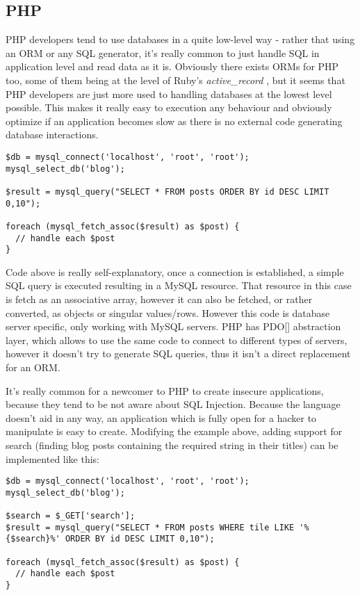 \subsection{PHP}

PHP developers tend to use databases in a quite low-level way - rather that using an ORM or any SQL generator, it's really common to just handle SQL in application level and read data as it is. Obviously there exists ORMs for PHP too, some of them being at the level of Ruby's \textit{active\_record} , but it seems that PHP developers are just more used to handling databases at the lowest level possible. This makes it really easy to execution any behaviour and obviously optimize if an application becomes slow as there is no external code generating database interactions.

\begin{codelisting}
\begin{verbatim}
$db = mysql_connect('localhost', 'root', 'root');
mysql_select_db('blog');

$result = mysql_query("SELECT * FROM posts ORDER BY id DESC LIMIT 0,10");

foreach (mysql_fetch_assoc($result) as $post) {
  // handle each $post
}
\end{verbatim}
\end{codelisting}

Code above is really self-explanatory, once a connection is established, a simple SQL query is executed resulting in a MySQL resource. That resource in this case is fetch as an associative array, however it can also be fetched, or rather converted, as objects or singular values/rows. However this code is database server specific, only working with MySQL servers. PHP has PDO[] abstraction layer, which allows to use the same code to connect to different types of servers, however it doesn't try to generate SQL queries, thus it isn't a direct replacement for an ORM.

It's really common for a newcomer to PHP to create insecure applications, because they tend to be not aware about SQL Injection. Because the language doesn't aid in any way, an application which is fully open for a hacker to manipulate is easy to create. Modifying the example above, adding support for search (finding blog posts containing the required string in their titles) can be implemented like this:

\begin{codelisting}
\begin{verbatim}
$db = mysql_connect('localhost', 'root', 'root');
mysql_select_db('blog');

$search = $_GET['search'];
$result = mysql_query("SELECT * FROM posts WHERE tile LIKE '%{$search}%' ORDER BY id DESC LIMIT 0,10");

foreach (mysql_fetch_assoc($result) as $post) {
  // handle each $post
}
\end{verbatim}
\end{codelisting}

